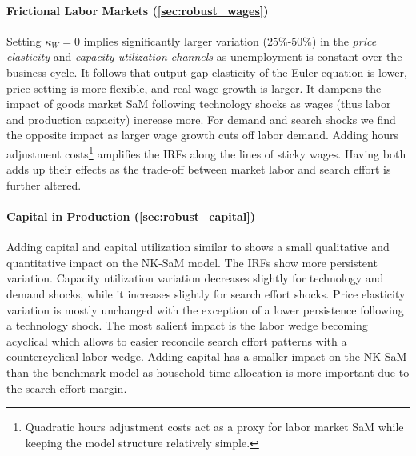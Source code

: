 \documentclass[12pt,3p,authoryear,review]{elsarticle}
\begin{document}
\paragraph{Frictional Labor Markets (\ref{sec:robust_wages})}%
Setting $\kappa_W=0$ implies significantly larger variation ($25\%$-$50\%$) in the \emph{price elasticity} and \emph{capacity utilization channels} as unemployment is constant over the business cycle. It follows that output gap elasticity of the Euler equation is lower, price-setting is more flexible, and real wage growth is larger. It dampens the impact of goods market SaM following technology shocks as wages (thus labor and production capacity) increase more. For demand and search shocks we find the opposite impact as larger wage growth cuts off labor demand. Adding hours adjustment costs\footnote{Quadratic hours adjustment costs act as a proxy for labor market SaM \citep{blanchardLaborMarketsMonetary2010} while keeping the model structure relatively simple.} \citep{lechthalerQuadraticLaborAdjustment2013} amplifies the IRFs along the lines of sticky wages. Having both adds up their effects as the trade-off between market labor and search effort is further altered.%
\paragraph{Capital in Production (\ref{sec:robust_capital})}%
Adding capital and capital utilization similar to \cite{christianoDSGEModelsMonetary2010} shows a small qualitative and quantitative impact on the NK-SaM model. The IRFs show more persistent variation. Capacity utilization variation decreases slightly for technology and demand shocks, while it increases slightly for search effort shocks. Price elasticity variation is mostly unchanged with the exception of a lower persistence following a technology shock. The most salient impact is the labor wedge becoming acyclical which allows to easier reconcile search effort patterns with a countercyclical labor wedge. Adding capital has a smaller impact on the NK-SaM than the benchmark model as household time allocation is more important due to the search effort margin.%
\end{document}
